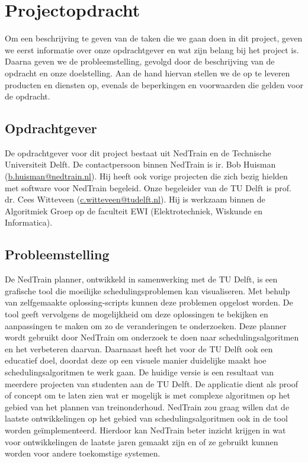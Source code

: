 \section{Projectopdracht}
Om een beschrijving te geven van de taken die we gaan doen in dit project, geven we eerst informatie over onze opdrachtgever en wat zijn belang bij het project is. Daarna geven we de probleemstelling, gevolgd door de beschrijving van de opdracht en onze doelstelling. Aan de hand hiervan stellen we de op te leveren producten en diensten op, evenals de beperkingen en voorwaarden die gelden voor de opdracht.

\subsection{Opdrachtgever}
De opdrachtgever voor dit project bestaat uit NedTrain en de Technische Universiteit Delft. De contactpersoon binnen NedTrain is ir. Bob Huisman (\href{mailto:b.huisman@nedtrain.nl}{b.huisman@nedtrain.nl}). Hij heeft ook vorige projecten die zich bezig hielden met software voor NedTrain begeleid. Onze begeleider van de TU Delft is prof. dr. Cees Witteveen (\href{mailto:c.witteveen@tudelft.nl}{c.witteveen@tudelft.nl}). Hij is werkzaam binnen de Algoritmiek Groep op de faculteit EWI (Elektrotechniek, Wiskunde en Informatica).

\subsection{Probleemstelling}
De NedTrain planner, ontwikkeld in samenwerking met de TU Delft, is een grafische tool die moeilijke schedulingsproblemen kan visualiseren. Met behulp van zelfgemaakte oplossing-scripts kunnen deze problemen opgelost worden. De tool geeft vervolgens de mogelijkheid om deze oplossingen te bekijken en aanpassingen te maken om zo de veranderingen te onderzoeken. Deze planner wordt gebruikt door NedTrain om onderzoek te doen naar schedulingsalgoritmen en het verbeteren daarvan. Daarnaast heeft het voor de TU Delft ook een educatief doel, doordat deze op een visuele manier duidelijke maakt hoe schedulingsalgoritmen te werk gaan. De huidige versie is een resultaat van meerdere projecten van studenten aan de TU Delft. De applicatie dient als proof of concept om te laten zien wat er mogelijk is met complexe algoritmen op het gebied van het plannen van treinonderhoud. NedTrain zou graag willen dat de laatste ontwikkelingen op het gebied van schedulingsalgoritmen ook in de tool worden ge\"implementeerd. Hierdoor kan NedTrain beter inzicht krijgen in wat voor ontwikkelingen de laatste jaren gemaakt zijn en of ze gebruikt kunnen worden voor andere toekomstige systemen.


